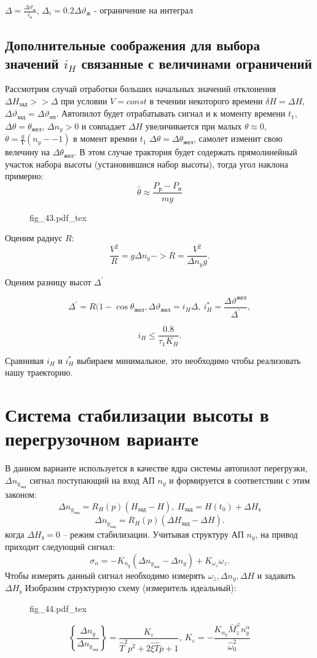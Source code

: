 \documentclass{article}
\newcommand{\incfig}[1]{
    {#1.pdf_tex}
}
\begin{document}
$\Delta =\frac{\Delta \vartheta_ж}{i_н}$, $\Delta_i = 0.2 \Delta \vartheta_ж$ - ограничение на интеграл

\subsection{Дополнительные соображения для выбора значений $i_H$ связанные с величинами ограничений}
Рассмотрим случай отработки больших начальных значений отклонения $\Delta H_{зад} >> \Delta$ при условии $V = const$ в течении некоторого времени $\delta H = \Delta H$, $\Delta \vartheta_{зад}  = \Delta \vartheta_{оп}$. Автопилот будет отрабатывать сигнал и к моменту времени $t_1$, $\Delta \theta = \theta_{жел}$, $ \Delta n_y  >0 $ и совпадает $\Delta H$ увеличивается при малых $\theta \approx 0$, $ \dot{\theta} = \frac{g}{V}(n_y - -1)$ в момент времни $t_1$ $\Delta \theta = \Delta \theta_{жел}$, самолет изменит свою велечину на $\Delta \theta_{жел}$. В этом случае трактория будет содержать прямолинейный участок набора высоты (установившися набор высоты), тогда угол наклона примерно:
\[
    \hat{\theta} \approx \frac{P_р - P_п}{mg}
\]

\begin{figure}[H]
    \centering
    \incfig{fig_43}
    \label{fig:fig_43}
\end{figure}

Оценим радиус $R$:
\[
    \frac{V^2}{R} = g \Delta n_y -> R = \frac{V^2}{ \Delta n_y g} 
.\]

Оценим разницу высот $\Delta^{'}$

\[
    \Delta^{'} = R(1 - \cos{\theta_{жел}}, \Delta \vartheta_{жел} = i_H \Delta, \ i_{H}^* = \frac{\Delta \vartheta^{жел}}{\Delta^{'}},
\]

\[
    i_H \le \frac{0.8}{\tau_1 K_H}
.\]

Сравнивая $i_H$ и $i_H^*$ выбираем минимальное, это необходимо чтобы реализовать нашу траекторию.

\section{Система стабилизации высоты в перегрузочном варианте}
В данном варианте используется в качестве ядра системы автопилот перегрузки, $ \Delta n_{y_{зад}}$ сигнал поступающий на вход АП $n_y$ и формируется в соответствии с этим законом:
\[
    \Delta n_{y_{зад}} = R_H(p) (H_{зад} - H), \ H_{зад} = H(t_0) + \Delta H_з
\]
\[
    \Delta n_{y_{зад}} = R_H(p) (\Delta H_{зад} - \Delta H)
.\]
когда $\Delta H_з = 0$ -- режим стабилизации. Учитывая структуру АП $n_y$, на привод приходит следующий сигнал:
\[
    \sigma_n = -K_{n_y} ( \Delta n_{y_{зад}} - \Delta n_y) + K_{\omega_z} \omega_z
.\]
Чтобы измерять данный сигнал необходимо измерять $\omega_z, \Delta n_y, \Delta H$ и задавать $\Delta H_з$
Изобразим структурную схему (измеритель идеальный):
\begin{figure}[H]
    \centering
    \incfig{fig_44}
    \label{fig:fig_44}
\end{figure}
\[
    \left\{ \frac{ \Delta n_y}{ \Delta n_{y_{зад}}} \right\}  = \frac{K_\varepsilon}{ \hat{T}^2 p^2 + 2 \hat{\xi} \hat{T}p + 1 }, \ K_\varepsilon = - \frac{K_{n_y} \bar{M}_z^{\varphi} n_y^\alpha }{\hat{\omega}_0^2}
\]
\end{document}
